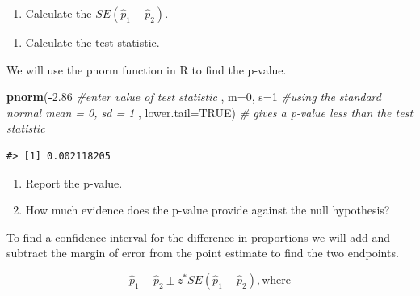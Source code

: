 \documentclass[
]{report}
\newenvironment{Shaded}{\begin{snugshade}}{\end{snugshade}}
\newcommand{\CommentTok}[1]{\textcolor[rgb]{0.56,0.35,0.01}{\textit{#1}}}
\newcommand{\DataTypeTok}[1]{\textcolor[rgb]{0.13,0.29,0.53}{#1}}
\newcommand{\DecValTok}[1]{\textcolor[rgb]{0.00,0.00,0.81}{#1}}
\newcommand{\FloatTok}[1]{\textcolor[rgb]{0.00,0.00,0.81}{#1}}
\newcommand{\KeywordTok}[1]{\textcolor[rgb]{0.13,0.29,0.53}{\textbf{#1}}}
\newcommand{\NormalTok}[1]{#1}
\newcommand{\OperatorTok}[1]{\textcolor[rgb]{0.81,0.36,0.00}{\textbf{#1}}}
\newcommand{\OtherTok}[1]{\textcolor[rgb]{0.56,0.35,0.01}{#1}}
\providecommand{\tightlist}{%
  \setlength{\itemsep}{0pt}\setlength{\parskip}{0pt}}
\begin{document}
\vspace{.25in}

\begin{enumerate}
\def\labelenumi{\arabic{enumi}.}
\setcounter{enumi}{17}
\tightlist
\item
  Calculate the \(SE(\hat{p}_1-\hat{p}_2)\).
\end{enumerate}

\vspace{1in}

\begin{enumerate}
\def\labelenumi{\arabic{enumi}.}
\setcounter{enumi}{18}
\tightlist
\item
  Calculate the test statistic.
\end{enumerate}

\vspace{1in}

We will use the pnorm function in R to find the p-value.

\begin{Shaded}
\begin{Highlighting}[]
\KeywordTok{pnorm}\NormalTok{(}\OperatorTok{{-}}\FloatTok{2.86} \CommentTok{\#enter value of test statistic}
\NormalTok{      , }\DataTypeTok{m=}\DecValTok{0}\NormalTok{, }\DataTypeTok{s=}\DecValTok{1} \CommentTok{\#using the standard normal mean = 0, sd = 1}
\NormalTok{      , }\DataTypeTok{lower.tail=}\OtherTok{TRUE}\NormalTok{) }\CommentTok{\# gives a p{-}value less than the test statistic}
\end{Highlighting}
\end{Shaded}

\begin{verbatim}
#> [1] 0.002118205
\end{verbatim}

\begin{enumerate}
\def\labelenumi{\arabic{enumi}.}
\setcounter{enumi}{19}
\item
  Report the p-value.
  \vspace{0.2in}
\item
  How much evidence does the p-value provide against the null hypothesis?
\end{enumerate}

\vspace{0.4in}

To find a confidence interval for the difference in proportions we will add and subtract the margin of error from the point estimate to find the two endpoints.

\[\hat{p}_1-\hat{p}_2\pm z^*SE(\hat{p}_1-\hat{p}_2), \text{where}\]
\end{document}
